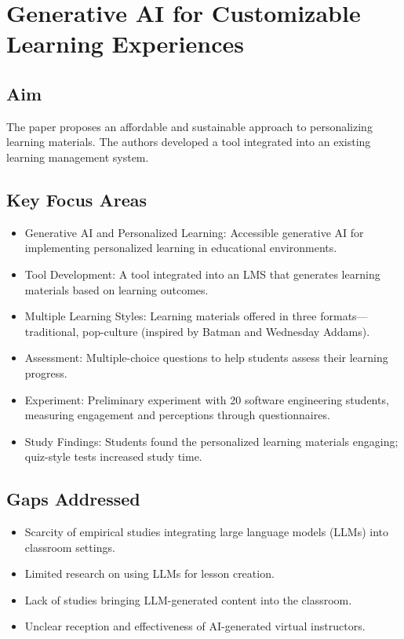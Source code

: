 \section{Generative AI for Customizable Learning Experiences}

\subsection{Aim}
The paper proposes an affordable and sustainable approach to personalizing learning materials. The authors developed a tool integrated into an existing learning management system.

\subsection{Key Focus Areas}
\begin{itemize}
    \item Generative AI and Personalized Learning: Accessible generative AI for implementing personalized learning in educational environments.
    \item Tool Development: A tool integrated into an LMS that generates learning materials based on learning outcomes.
    \item Multiple Learning Styles: Learning materials offered in three formats—traditional, pop-culture (inspired by Batman and Wednesday Addams).
    \item Assessment: Multiple-choice questions to help students assess their learning progress.
    \item Experiment: Preliminary experiment with 20 software engineering students, measuring engagement and perceptions through questionnaires.
    \item Study Findings: Students found the personalized learning materials engaging; quiz-style tests increased study time.
\end{itemize}

\subsection{Gaps Addressed}
\begin{itemize}
    \item Scarcity of empirical studies integrating large language models (LLMs) into classroom settings.
    \item Limited research on using LLMs for lesson creation.
    \item Lack of studies bringing LLM-generated content into the classroom.
    \item Unclear reception and effectiveness of AI-generated virtual instructors.
\end{itemize}
